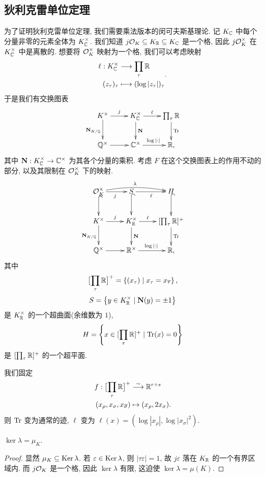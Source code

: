 \subsection{狄利克雷单位定理}
为了证明狄利克雷单位定理, 我们需要乘法版本的闵可夫斯基理论.
记 $K_{\mathbb{C}}$ 中每个分量非零的元素全体为 $K_{\mathbb{C}}^\times$.
我们知道 $j{\mathcal{O}}_K\subseteq K_{\mathbb{R}}\subseteq K_{\mathbb{C}}$ 是一个格, 因此 $j{\mathcal{O}}_K^\times$ 在 $K_{\mathbb{C}}^\times$ 中是离散的. 想要将 ${\mathcal{O}}_K^\times$ 映射为一个格, 我们可以考虑映射
	\[\begin{split}\ell:K_{\mathbb{C}}^\times &\longrightarrow \prod_\tau{\mathbb{R}} \\ (z_\tau)_\tau &\longmapsto (\log|z_\tau|)_\tau\end{split}.\]
于是我们有交换图表
	\[\xymatrix{
		K^\times\ar[r]^j\ar[d]_{\bfN_{K/\BQ}} & K_\BC^\times \ar[r]^-\ell\ar[d]^\bfN & \prod_\tau \BR\ar[d]^\Tr\\
		\BQ^\times\ar[r]&\BC^\times\ar[r]^{\log|\cdot|}&\BR,
	}\]
其中 ${\mathbf{N}}:K_{\mathbb{C}}^\times\to{\mathbb{C}}^\times$ 为其各个分量的乘积.
考虑 $F$ 在这个交换图表上的作用不动的部分, 以及其限制在 ${\mathcal{O}}_K^\times$ 下的映射.
	\[\xymatrix{
		\CO_K^\times\ar[r]_j\ar@{^(->}[d]\ar@/^/[rr]^{\lambda}
		&S\ar[r]_\ell\ar@{^(->}[d]
		&H\ar@{^(->}[d]\\
		K^\times\ar[r]^j\ar[d]_{\bfN_{K/\BQ}} & K_\BR^\times \ar[r]^-\ell\ar[d]^\bfN & [\prod_\tau \BR]^+\ar[d]^\Tr\\
		\BQ^\times\ar[r]&\BR^\times\ar[r]^{\log|\cdot|}&\BR,
	}\]
其中 
	\[\bigl[\prod_\tau {\mathbb{R}}\bigr]^+=\left\{(x_\tau)\mid x_{\tau}=x_{\overline \tau}\right\},\]
	\[S=\left\{y\in K_{\mathbb{R}}^\times\mid {\mathbf{N}}(y)=\pm 1\right\}\]
是 $K_{\mathbb{R}}^\times$ 的一个超曲面(余维数为 $1$),
	\[H=\left\{x\in [\prod_\tau {\mathbb{R}}]^+\mid {\mathrm{Tr}}(x)=0\right\}\]
是 $[\prod_\tau {\mathbb{R}}]^+$ 的一个超平面.

我们固定
	\[\begin{split}
f:\bigl[\prod_\tau {\mathbb{R}}\bigr]^+&\stackrel{\sim}{\longrightarrow} {\mathbb{R}}^{r+s}\\
(x_\rho,x_\sigma,x_{\overline \sigma})&\mapsto (x_\rho,2x_\sigma).
\end{split}\]
则 ${\mathrm{Tr}}$ 变为通常的迹, $\ell$ 变为 $\ell(x)=(\log|x_\rho|,\log|x_\sigma|^2).$

\begin{proposition}{}{}
$\ker\lambda=\mu_K$.
\end{proposition}
\begin{proof}
显然 $\mu_K\subseteq {\mathrm{Ker}\,}\lambda$. 若 $\varepsilon\in{\mathrm{Ker}\,}\lambda$, 则 $|\tau \varepsilon|=1$, 故 $j\varepsilon$ 落在 $K_{\mathbb{R}}$ 的一个有界区域内. 而 $j{\mathcal{O}}_K$ 是一个格, 因此 $\ker\lambda$ 有限, 这迫使 $\ker\lambda=\mu(K)$.
\end{proof}

